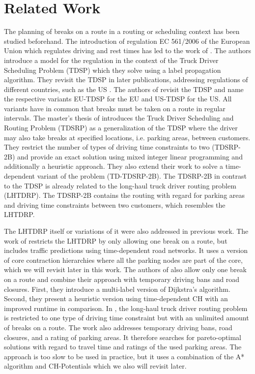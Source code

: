 
\chapter{Related Work\label{ch:related_work}}
The planning of breaks on a route in a routing or scheduling context has been studied beforehand. The introduction of regulation EC 561/2006 of the European Union which regulates driving and rest times has led to the work of \cite{goel:2009}. The authors introduce a model for the regulation in the context of the Truck Driver Scheduling Problem (TDSP) which they solve using a label propagation algorithm. They revisit the TDSP in later publications, addressing regulations of different countries, such as the US \cite{goel:2012}. The authors of \cite{sartori:20210107} revisit the TDSP and name the respective variants EU-TDSP for the EU and US-TDSP for the US. All variants have in common that breaks must be taken on a route in regular intervals. The master's thesis of \cite{bomsdorf:2020} introduces the Truck Driver Scheduling and Routing Problem (TDSRP) as a generalization of the TDSP where the driver may also take breaks at specified locations, i.e. parking areas, between customers. They restrict the number of types of driving time constraints to two (TDSRP-2B) and provide an exact solution using mixed integer linear programming and additionally a heuristic approach. They also extend their work to solve a time-dependent variant of the problem (TD-TDSRP-2B). The TDSRP-2B in contrast to the TDSP is already related to the long-haul truck driver routing problem (LHTDRP). The TDSRP-2B contains the routing with regard for parking areas and driving time constraints between two customers, which resembles the LHTDRP.

The LHTDRP itself or variations of it were also addressed in previous work. The work of \cite{kleff:2017} restricts the LHTDRP by only allowing one break on a route, but includes traffic predictions using time-dependent road networks. It uses a version of core contraction hierarchies where all the parking nodes are part of the core, which we will revisit later in this work. The authors of \cite{tuin:2018} also allow only one break on a route and combine their approach with temporary driving bans and road closures. First, they introduce a multi-label version of Dijkstra's algorithm. Second, they present a heuristic version using time-dependent CH with an improved runtime in comparison.  In \cite{kleff:2020}, the long-haul truck driver routing problem is restricted to one type of driving time constraint but with an unlimited amount of breaks on a route. The work also addresses temporary driving bans, road closures, and a rating of parking areas. It therefore searches for pareto-optimal solutions with regard to travel time and ratings of the used parking areas. The approach is too slow to be used in practice, but it uses a combination of the A* algorithm and CH-Potentials which we also will revisit later.

